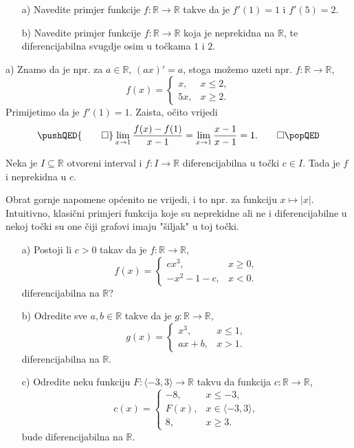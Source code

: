 \begin{exercise} \textbf{}
\begin{itemize}
\item[a)] Navedite primjer funkcije $f : \mathbb{R}\to \mathbb{R}$ takve da je $f'(1)=1$ i $f'(5)=2$.
\item[b)] Navedite primjer funkcije $f : \mathbb{R}\to \mathbb{R}$ koja je neprekidna na $\mathbb{R}$, te diferencijabilna svugdje osim u točkama $1$ i $2$.
\end{itemize}
\end{exercise}
\begin{proof*}
a) Znamo da je npr. za $a\in \mathbb{R}$, $\left(ax\right)'=a$, stoga možemo uzeti npr. $f : \mathbb{R}\to \mathbb{R}$,
$$f(x)=\begin{cases}
x, & x\leq 2,\\
5x, & x\geq 2.
\end{cases}$$
Primijetimo da je $f'(1)=1$. Zaista, očito vrijedi
\[
\pushQED{\qed}
\lim\limits_{x\to 1}{\dfrac{f(x)-f(1)}{x-1}}=\lim\limits_{x\to 1}{\dfrac{x-1}{x-1}}=1.\qedhere
\popQED
\]
\end{proof*}
\begin{remark}
Neka je $I\subseteq \mathbb{R}$ otvoreni interval i $f : I \to \mathbb{R}$ diferencijabilna u točki $c\in I$. Tada je $f$ i neprekidna u $c$.
\end{remark}
Obrat gornje napomene općenito ne vrijedi, i to npr. za funkciju $x\mapsto |x|$. Intuitivno, klasični primjeri funkcija koje su neprekidne ali ne i diferencijabilne u nekoj točki su one čiji grafovi imaju "šiljak" u toj točki.
\begin{exercise} \textbf{}
\label{idkhowtonamethis}
\begin{itemize}
\item[a)] Postoji li $c>0$ takav da je $f : \mathbb{R}\to \mathbb{R}$,
$$f(x)=\begin{cases}
cx^3,& x\geq 0,\\
-x^2-1-c,& x<0.
\end{cases}$$
diferencijabilna na $\mathbb{R}$?
\item[b)] Odredite sve $a, b\in \mathbb{R}$ takve da je $g : \mathbb{R}\to \mathbb{R}$,
$$g(x)=\begin{cases}
x^3,& x\leq 1,\\
ax+b,& x>1.
\end{cases}$$
diferencijabilna na $\mathbb{R}$.
\item[c)] Odredite neku funkciju $F : \langle -3, 3\rangle\to \mathbb{R}$ takvu da funkcija $c:\mathbb{R}\to \mathbb{R}$,
$$c(x)=\begin{cases}
-8,& x\leq -3,\\
F(x),& x\in \langle -3, 3\rangle,\\
8,& x\geq 3.
\end{cases}$$
bude diferencijabilna na $\mathbb{R}$.
\end{itemize}
\end{exercise}
